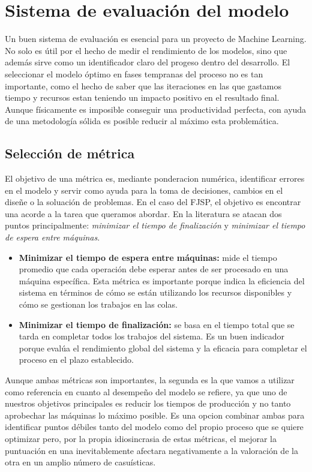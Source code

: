 \section{Sistema de evaluación del modelo}
Un buen sistema de evaluación es esencial para un proyecto de Machine Learning.
No solo es útil por el hecho de medir el rendimiento de los modelos,
sino que además sirve como un identificador claro del progeso dentro del desarrollo.
El seleccionar el modelo óptimo en fases tempranas del proceso no es tan importante,
como el hecho de saber que las iteraciones en las que gastamos tiempo y recursos estan teniendo un impacto
positivo en el resultado final. Aunque físicamente es imposible conseguir una productividad
perfecta, con ayuda de una metodología sólida es posible reducir al máximo esta problemática.

\subsection{Selección de métrica}
El objetivo de una métrica es, mediante ponderacion numérica, identificar errores en el modelo y
servir como ayuda para la toma de decisiones, cambios en el diseñe o la soluación de problemas. En el caso del
FJSP, el objetivo es encontrar una acorde a la tarea que queramos abordar. En la literatura se atacan dos puntos
principalmente: \textit{minimizar el tiempo de finalización} y \textit{minimizar el tiempo de espera entre máquinas}.

\begin{itemize}
    \item \textbf{Minimizar el tiempo de espera entre máquinas:} mide el tiempo promedio que cada operación debe
          esperar antes de ser procesado en una máquina específica. Esta métrica es importante porque
          indica la eficiencia del sistema en términos de cómo se están utilizando los recursos disponibles
          y cómo se gestionan los trabajos en las colas.
    \item \textbf{Minimizar el tiempo de finalización:} se basa en el tiempo total que se tarda en completar todos
          los trabajos del sistema. Es un buen indicador porque evalúa el rendimiento global del sistema
          y la eficacia para completar el proceso en el plazo establecido.
\end{itemize}

Aunque ambas métricas son importantes, la segunda es la que vamos a utilizar como referencia en cuanto al
desempeño del modelo se refiere, ya que uno de nuestros objetivos principales es reducir los tiempos de producción y no tanto
aprobechar las máquinas lo máximo posible. Es una opcion combinar ambas para identificar puntos débiles tanto del modelo
como del propio proceso que se quiere optimizar pero, por la propia idiosincrasia de estas métricas, el mejorar la puntuación
en una inevitablemente afectara negativamente a la valoración de la otra en un amplio número de casuísticas.

